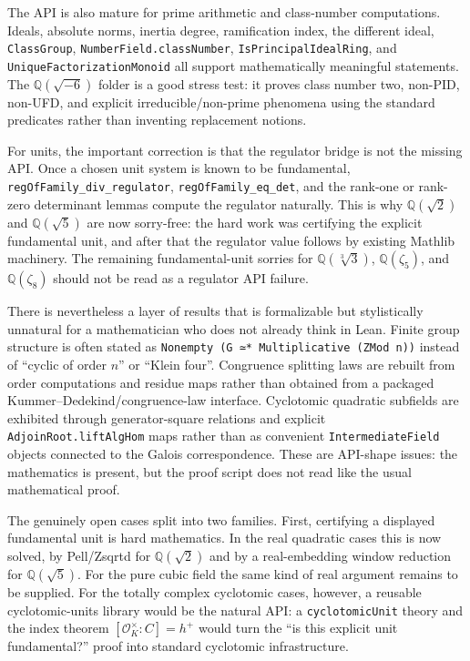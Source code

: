 \documentclass[UTF8,a4paper,11pt,fontset=fandol]{ctexart}
\theoremstyle{definition}
\begin{document}
The API is also mature for prime arithmetic and class-number computations.  Ideals, absolute
norms, inertia degree, ramification index, the different ideal, \texttt{ClassGroup},
\texttt{NumberField.classNumber}, \texttt{IsPrincipalIdealRing}, and
\texttt{UniqueFactorizationMonoid} all support mathematically meaningful statements.  The
\(\mathbb Q(\sqrt{-6})\) folder is a good stress test: it proves class number two, non-PID,
non-UFD, and explicit irreducible/non-prime phenomena using the standard predicates rather than
inventing replacement notions.

For units, the important correction is that the regulator bridge is not the missing API.  Once a
chosen unit system is known to be fundamental, \texttt{regOfFamily\_\allowbreak{}div\_\allowbreak{}regulator},
\texttt{regOfFamily\_\allowbreak{}eq\_\allowbreak{}det}, and the rank-one or rank-zero determinant lemmas compute the
regulator naturally.  This is why \(\mathbb Q(\sqrt2)\) and \(\mathbb Q(\sqrt5)\) are now
sorry-free: the hard work was certifying the explicit fundamental unit, and after that the
regulator value follows by existing Mathlib machinery.  The remaining fundamental-unit sorries
for \(\mathbb Q(\sqrt[3]{3})\), \(\mathbb Q(\zeta_5)\), and \(\mathbb Q(\zeta_8)\) should not be
read as a regulator API failure.

There is nevertheless a layer of results that is formalizable but stylistically unnatural for a
mathematician who does not already think in Lean.  Finite group structure is often stated as
\texttt{Nonempty (G ≃* Multiplicative (ZMod n))} instead of ``cyclic of order \(n\)'' or
``Klein four''.  Congruence splitting laws are rebuilt from order computations and residue maps
rather than obtained from a packaged Kummer--Dedekind/congruence-law interface.  Cyclotomic
quadratic subfields are exhibited through generator-square relations and explicit
\texttt{AdjoinRoot.liftAlgHom} maps rather than as convenient \texttt{IntermediateField} objects
connected to the Galois correspondence.  These are API-shape issues: the mathematics is present,
but the proof script does not read like the usual mathematical proof.

The genuinely open cases split into two families.  First, certifying a displayed fundamental unit
is hard mathematics.  In the real quadratic cases this is now solved, by Pell/Zsqrtd for
\(\mathbb Q(\sqrt2)\) and by a real-embedding window reduction for \(\mathbb Q(\sqrt5)\).  For the
pure cubic field the same kind of real argument remains to be supplied.  For the totally complex
cyclotomic cases, however, a reusable cyclotomic-units library would be the natural API: a
\texttt{cyclotomicUnit} theory and the index theorem \([\mathcal O_K^\times:C]=h^+\) would turn the
``is this explicit unit fundamental?'' proof into standard cyclotomic infrastructure.
\end{document}
